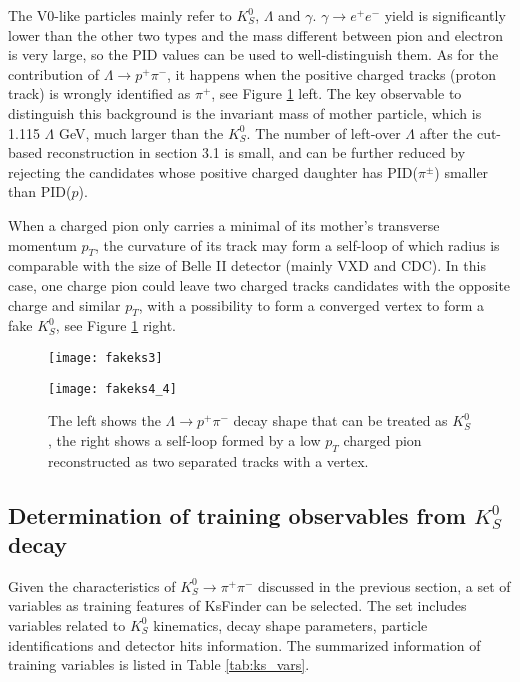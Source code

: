 The V0-like particles mainly refer to $K_S^0$, $\Lambda$ and $\gamma$. $\gamma \to e^+ e^-$ yield is significantly lower than the other two types and the mass different between pion and electron is very large, so the PID values can be used to well-distinguish them. As for the contribution of $\Lambda \to p^+ \pi^-$, it happens when the positive charged tracks (proton track) is wrongly identified as $\pi^+$, see Figure \ref{fig:fakeks2} left. The key observable to distinguish this background is the invariant mass of mother particle, which is 1.115 $\Lambda$ GeV, much larger than the $K_S^0$. The number of left-over $\Lambda$ after the cut-based reconstruction in section 3.1 is small, and can be further reduced by rejecting the candidates whose positive charged daughter has PID($\pi^{\pm}$) smaller than PID($p$).

When a charged pion only carries a minimal of its mother's transverse momentum $p_T$, the curvature of its track may form a self-loop of which radius is comparable with the size of Belle II detector (mainly VXD and CDC). In this case, one charge pion could leave two charged tracks candidates with the opposite charge and similar $p_T$, with a possibility to form a converged vertex to form a fake $K_S^0$, see Figure \ref{fig:fakeks2} right.

\begin{figure}[htbp]
	\begin{minipage}[t]{0.5\linewidth} %
		\centering 
		\texttt{[image: fakeks3]} 
		\label{fig:side:a} 
	\end{minipage}%
	\begin{minipage}[t]{0.5\linewidth} 
		\centering 
		\texttt{[image: fakeks4\_4]} 
		\label{fig:side:b} 
	\end{minipage}%
	
	\caption{The left shows the $\Lambda \to p^+ \pi^-$ decay shape that can be treated as $K_S^0$, the right shows a self-loop formed by a low $p_T$ charged pion reconstructed as two separated tracks with a vertex.}
	\label{fig:fakeks2}
\end{figure}

\subsection{Determination of training observables from $K_S^0$ decay }
Given the characteristics of  $K_S^0 \to \pi^+ \pi^-$ discussed in the previous section, a set of variables as training features of KsFinder can be selected. The set includes variables related to $K_S^0$ kinematics, decay shape parameters, particle identifications and detector hits information. The summarized information of training variables is listed in Table \ref{tab:ks_vars}.

